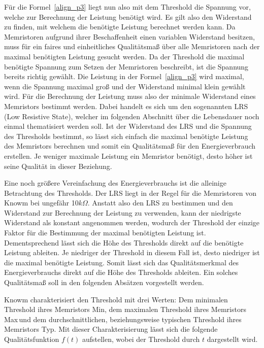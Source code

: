   Für die Formel~\ref{align_p3} liegt nun also mit dem Threshold die Spannung vor, welche zur Berechnung der Leistung benötigt wird. Es gilt also den Widerstand zu finden, mit welchem die benötigte Leistung berechnet werden kann. Da Memristoren aufgrund ihrer Beschaffenheit einen variablen Widerstand besitzen, muss für ein faires und einheitliches Qualitätsmaß über alle Memristoren nach der maximal benötigten Leistung gesucht werden. Da der Threshold die maximal benötigte Spannung zum Setzen der Memristoren beschreibt, ist die Spannung bereits richtig gewählt. Die Leistung in der Formel~\ref{align_p3} wird maximal, wenn die Spannung maximal groß und der Widerstand minimal klein gewählt wird. Für die Berechnung der Leistung muss also der minimale Widerstand eines Memristors bestimmt werden. Dabei handelt es sich um den sogenannten LRS (Low Resistive State), welcher im folgenden Abschnitt über die Lebensdauer noch einmal thematisiert werden soll. Ist der Widerstand des LRS und die Spannung des Thresholds bestimmt, so lässt sich einfach die maximal benötigte Leistung des Memristors berechnen und somit ein Qualitätsmaß für den Energieverbrauch erstellen. Je weniger maximale Leistung ein Memristor benötigt, desto höher ist seine Qualität in dieser Beziehung.

  Eine noch größere Vereinfachung des Energieverbrauchs ist die alleinige Betrachtung des Thresholds. Der LRS liegt in der Regel für die Memristoren von Knowm bei ungefähr 10$k\Omega$. Anstatt also den LRS zu bestimmen und den Widerstand zur Berechnung der Leistung zu verwenden, kann der niedrigste Widerstand als konstant angenommen werden, wodurch der Threshold der einzige Faktor für die Bestimmung der maximal benötigten Leistung ist. Dementsprechend lässt sich die Höhe des Thresholds direkt auf die benötigte Leistung ableiten. Je niedriger der Threshold in diesem Fall ist, desto niedriger ist die maximal benötigte Leistung. Somit lässt sich das Qualitätsmerkmal des Energieverbrauchs direkt auf die Höhe des Thresholds ableiten. Ein solches Qualitätsmaß soll in den folgenden Absätzen vorgestellt werden.

  Knowm charakterisiert den Threshold mit drei Werten: Dem minimalen Threshold ihres Memristors \glqq Min\grqq, dem maximalen Threshold ihres Memristors \glqq Max\grqq\,und dem durchschnittlichen, beziehungsweise typischen Threshold ihres Memristors \glqq Typ\grqq. Mit dieser Charakterisierung lässt sich die folgende Qualitätsfunktion $f(t)$ aufstellen, wobei der Threshold durch $t$ dargestellt wird.

